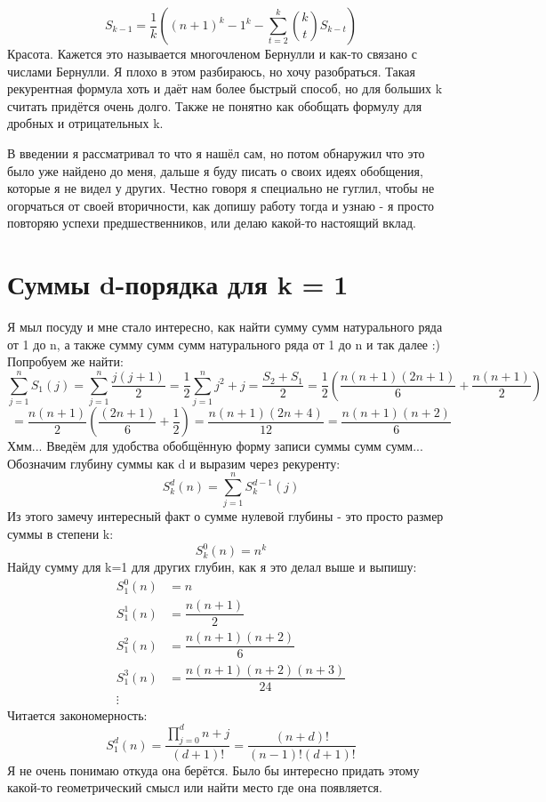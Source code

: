\documentclass{article} %
\begin{document}
{		$$S_{k-1} = \dfrac{1}{k}((n+1)^k - 1^k - \sum_{t=2}^{k}{{k}\choose{t}}S_{k-t})$$
		Красота. Кажется это называется многочленом Бернулли и как-то связано с числами Бернулли. Я плохо в этом разбираюсь, но хочу разобраться. Такая рекурентная формула хоть и даёт нам более быстрый способ, но для больших k считать придётся очень долго. Также не понятно как обобщать формулу для дробных и отрицательных k. 
		
		В введении я рассматривал то что я нашёл сам, но потом обнаружил что это было уже найдено до меня, дальше я буду писать о своих идеях обобщения, которые я не видел у других. Честно говоря я специально не гуглил, чтобы не огорчаться от своей вторичности, как допишу работу тогда и узнаю - я просто повторяю успехи предшественников, или делаю какой-то настоящий вклад.
	}
	
	\section{Суммы d-порядка для k = 1}{Я мыл посуду и мне стало интересно, как найти сумму сумм натурального ряда от 1 до n, а также сумму сумм сумм натурального ряда от 1 до n и так далее :) Попробуем же найти:
		$$\sum_{j=1}^{n}S_1(j) = \sum_{j=1}^{n}\dfrac{j(j+1)}{2} = \dfrac{1}{2}\sum_{j=1}^{n}j^2+j = \dfrac{S_2+S_1}{2} = \dfrac{1}{2}(\dfrac{n(n+1)(2n+1)}{6} + \dfrac{n(n+1)}{2})$$
		$$= \dfrac{n(n+1)}{2}(\dfrac{(2n+1)}{6} + \dfrac{1}{2}) = \dfrac{n(n+1)(2n+4)}{12} = \dfrac{n(n+1)(n+2)}{6}$$
		Хмм... Введём для удобства обобщённую форму записи суммы сумм сумм... Обозначим глубину суммы как d и выразим через рекуренту:
		$$S_k^d(n) = \sum_{j=1}^{n}S_k^{d-1}(j)$$
		Из этого замечу интересный факт о сумме нулевой глубины - это просто размер суммы в степени k:
		$$S_k^0(n) = n^k$$
		Найду сумму для k=1 для других глубин, как я это делал выше и выпишу:
		\begin{align*}
			S_1^0(n) &= n\\
			S_1^1(n) &= \dfrac{n(n+1)}{2}\\
			S_1^2(n) &= \dfrac{n(n+1)(n+2)}{6}\\
			S_1^3(n) &= \dfrac{n(n+1)(n+2)(n+3)}{24}\\
			\vdots
		\end{align*}
		Читается закономерность:
		$$S_1^d(n) = \dfrac{\displaystyle \prod_{j=0}^{d}n+j}{(d+1)!} = \dfrac{(n+d)!}{(n-1)!(d+1)!}$$
		Я не очень понимаю откуда она берётся. Было бы интересно придать этому какой-то геометрический смысл или найти место где она появляется.
	}
	\newpage
	
\end{document}
